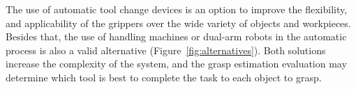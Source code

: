 The use of automatic tool change devices is an option to improve the flexibility, and
applicability of the grippers over the wide variety of objects and workpieces. Besides that, the use of handling machines or dual-arm robots in the automatic process is also a valid alternative (Figure~\ref{fig:alternatives}). Both solutions increase the complexity of the system, and the grasp estimation evaluation may determine which tool is best to complete the task to each object to grasp.

\begin{figure}[h!]
\end{figure}